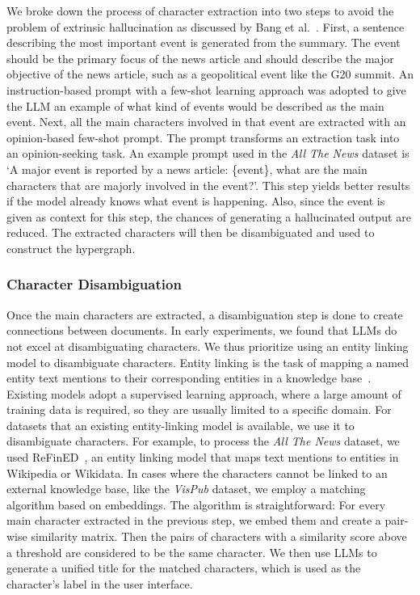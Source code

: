 We broke down the process of character extraction into two steps to avoid the problem of extrinsic hallucination as discussed by Bang et al.~\cite{bang2023multitask}.
First, a sentence describing the most important event is generated from the summary. 
The event should be the primary focus of the news article and should describe the major objective of the news article, such as a geopolitical event like the G20 summit.
An instruction-based prompt with a few-shot learning approach was adopted to give the LLM an example of what kind of events would be described as the main event. 
Next, all the main characters involved in that event are extracted with an opinion-based few-shot prompt.
The prompt transforms an extraction task into an opinion-seeking task.
An example prompt used in the \textit{All The News} dataset is 
`A major event is reported by a news article: \{event\},
what are the main characters that are majorly involved in the event?'.
This step yields better results if the model already knows what event is happening.
Also, since the event is given as context for this step, the chances of generating a hallucinated output are reduced.
The extracted characters will then be disambiguated and used to construct the hypergraph.

\subsubsection{Character Disambiguation}\label{sec: character_disambiguation}
Once the main characters are extracted, a disambiguation step is done to create connections between documents.
In early experiments, we found that LLMs do not excel at disambiguating characters.
We thus prioritize using an entity linking model to disambiguate characters.
Entity linking is the task of mapping a named entity text mentions to their corresponding entities in a knowledge base~\cite{shen2014entity}.
Existing models adopt a supervised learning approach, where a large amount of training data is required, so they are usually limited to a specific domain.
For datasets that an existing entity-linking model is available, we use it to disambiguate characters.
For example, to process the \textit{All The News} dataset, we used ReFinED~\cite{ayoola2022refined}, an entity linking model that maps text mentions to entities in Wikipedia or Wikidata.
In cases where the characters cannot be linked to an external knowledge base, like the \textit{VisPub} dataset, we employ a matching algorithm based on embeddings.
The algorithm is straightforward:
For every main character extracted in the previous step, we embed them and create a pair-wise similarity matrix.
Then the pairs of characters with a similarity score above a threshold are considered to be the same character.
We then use LLMs to generate a unified title for the matched characters, which is used as the character's label in the user interface.

